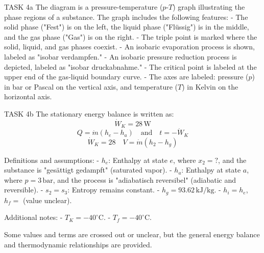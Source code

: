 TASK 4a  
The diagram is a pressure-temperature (\( p \)-\( T \)) graph illustrating the phase regions of a substance. The graph includes the following features:  
- The solid phase ("Fest") is on the left, the liquid phase ("Flüssig") is in the middle, and the gas phase ("Gas") is on the right.  
- The triple point is marked where the solid, liquid, and gas phases coexist.  
- An isobaric evaporation process is shown, labeled as "isobar verdampfen."  
- An isobaric pressure reduction process is depicted, labeled as "isobar druckabnahme."  
- The critical point is labeled at the upper end of the gas-liquid boundary curve.  
- The axes are labeled: pressure (\( p \)) in bar or Pascal on the vertical axis, and temperature (\( T \)) in Kelvin on the horizontal axis.  

TASK 4b  
The stationary energy balance is written as:  
\[
\dot{W}_K = 28 \, \text{W}
\]  
\[
Q = \dot{m} (h_e - h_a) \quad \text{and} \quad t = -\dot{W}_K
\]  
\[
\dot{W}_K = 28 \quad V = \dot{m} (h_2 - h_g)
\]  

Definitions and assumptions:  
- \( h_e \): Enthalpy at state \( e \), where \( x_2 = ? \), and the substance is "gesättigt gedampft" (saturated vapor).  
- \( h_a \): Enthalpy at state \( a \), where \( p = 3 \, \text{bar} \), and the process is "adiabatisch reversibel" (adiabatic and reversible).  
- \( s_2 = s_3 \): Entropy remains constant.  
- \( h_g = 93.62 \, \text{kJ/kg} \).  
- \( h_i = h_e \), \( h_f = \) (value unclear).  

Additional notes:  
- \( T_K = -40^\circ\text{C} \).  
- \( T_f = -40^\circ\text{C} \).  

Some values and terms are crossed out or unclear, but the general energy balance and thermodynamic relationships are provided.